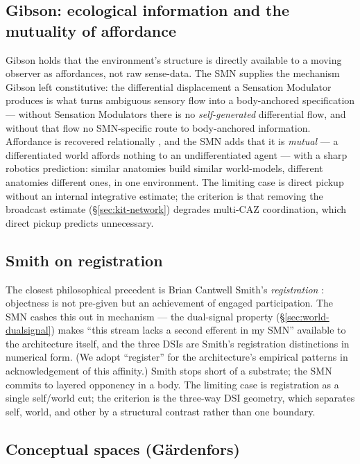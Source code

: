 \documentclass{article}
\begin{document}
\subsection{Gibson: ecological information and the mutuality of
affordance}\label{sec:rel-gibson}

Gibson \citep{Gibson1979EcologicalApproach} holds that the environment's
structure is directly available to a moving observer as affordances, not
raw sense-data.  The SMN supplies the mechanism Gibson left constitutive:
the differential displacement a Sensation Modulator produces is what
turns ambiguous sensory flow into a body-anchored specification --- without
Sensation Modulators there is no \emph{self-generated} differential flow, and
without that flow no SMN-specific route to body-anchored information.  Affordance is
recovered relationally \citep{Chemero2003-fm}, and the SMN adds that it
is \emph{mutual} --- a differentiated world affords nothing to an
undifferentiated agent --- with a sharp robotics prediction: similar
anatomies build similar world-models, different anatomies different ones,
in one environment.  The limiting case is direct pickup without an
internal integrative estimate; the criterion is that removing the
broadcast estimate (\S\ref{sec:kit-network}) degrades multi-CAZ
coordination, which direct pickup predicts unnecessary.

\subsection{Smith on registration}\label{sec:rel-smith}

The closest philosophical precedent is Brian Cantwell Smith's
\emph{registration} \citep{Smith1996OriginObjects}: objectness is not
pre-given but an achievement of engaged participation.  The SMN cashes
this out in mechanism --- the dual-signal property
(\S\ref{sec:world-dualsignal}) makes ``this stream lacks a second
efferent in my SMN'' available to the architecture itself, and the three
DSIs are Smith's registration distinctions in numerical form.  (We adopt
``register'' for the architecture's empirical patterns in acknowledgement
of this affinity.)  Smith stops short of a substrate; the SMN commits to
layered opponency in a body.  The limiting case is registration as a
single self/world cut; the criterion is the three-way DSI geometry, which
separates self, world, and other by a structural contrast rather than one
boundary.

\subsection{Conceptual spaces (G\"ardenfors)}\label{sec:rel-gardenfors}
\end{document}
